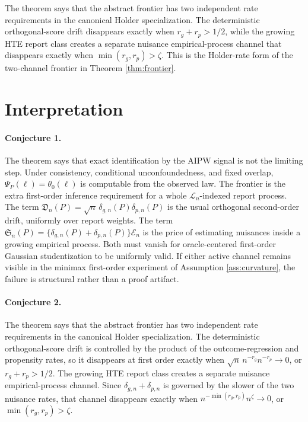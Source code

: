 \documentclass[11pt]{article}
\theoremstyle{definition}
\theoremstyle{plain}
\theoremstyle{remark}
\begin{document}
The theorem says that the abstract frontier has two independent rate
requirements in the canonical Holder specialization.  The deterministic
orthogonal-score drift disappears exactly when \(r_g+r_p>1/2\), while the
growing HTE report class creates a separate nuisance empirical-process channel
that disappears exactly when \(\min(r_g,r_p)>\zeta\).  This is the Holder-rate
form of the two-channel frontier in Theorem \ref{thm:frontier}.

\section{Interpretation}
\paragraph{Conjecture 1.}
The theorem says that exact identification by the AIPW signal is not the
limiting step.  Under consistency, conditional unconfoundedness, and fixed
overlap, \(\Psi_P(\ell)=\theta_0(\ell)\) is computable from the observed law.
The frontier is the extra first-order inference requirement for a whole
\(\mathcal{L}_n\)-indexed report process.  The term
\(\mathfrak{D}_n(P)=\sqrt n\,\delta_{g,n}(P)\delta_{p,n}(P)\) is the usual
orthogonal second-order drift, uniformly over report weights.  The term
\(\mathfrak{S}_n(P)=\{\delta_{g,n}(P)+\delta_{p,n}(P)\}\mathcal{E}_n\) is the
price of estimating nuisances inside a growing empirical process.  Both must
vanish for oracle-centered first-order Gaussian studentization to be uniformly
valid.  If either active channel remains visible in the minimax first-order
experiment of Assumption \ref{ass:curvature}, the failure is structural rather
than a proof artifact.

\paragraph{Conjecture 2.}
The theorem says that the abstract frontier has two independent rate
requirements in the canonical Holder specialization.  The deterministic
orthogonal-score drift is controlled by the product of the outcome-regression
and propensity rates, so it disappears at first order exactly when
\(\sqrt n\,n^{-r_g}n^{-r_p}\to0\), or \(r_g+r_p>1/2\).  The growing HTE report
class creates a separate nuisance empirical-process channel.  Since
\(\delta_{g,n}+\delta_{p,n}\) is governed by the slower of the two nuisance
rates, that channel disappears exactly when
\(n^{-\min(r_g,r_p)}n^\zeta\to0\), or \(\min(r_g,r_p)>\zeta\).
\end{document}
